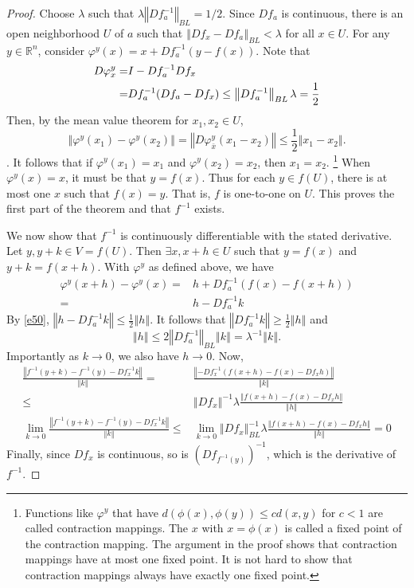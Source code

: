 \documentclass[12pt,reqno]{amsart}
\theoremstyle{definition}
\def\R{\mathbb{R}}
\newcommand{\norm}[1]{\left\Vert {#1} \right\Vert}
\renewcommand{\to}{{\rightarrow}}
\begin{document}
\begin{proof} 
  Choose $\lambda$ such that $\lambda \norm{Df_a^{-1}}_{BL} = 1/2$. Since
  $Df_a$ is continuous, there is an open neighborhood $U$ of $a$ such
  that $\norm{Df_x - Df_a}_{BL} < \lambda$ for all $x \in U$. For any $y
  \in \R^n$, consider $\varphi^y(x) = x + Df_a^{-1} \left(y - f(x)
  \right)$. Note that 
  \begin{align}
    D \varphi^y_x = & I - Df_a^{-1} Df_x \notag \\ 
    = & Df_a^{-1} (Df_a - Df_x) \leq \norm{Df_a^{-1}}_{BL} \lambda =
    \frac{1}{2} \label{e50}
  \end{align}
  Then, by the mean value theorem for $x_1, x_2 \in U$, 
  \[ \norm{\varphi^y(x_1) - \varphi^y(x_2)} = \norm{D\varphi^y_{\bar{x}}
    (x_1 - x_2) } \leq \frac{1}{2} \norm{x_1 - x_2}. \].
  It follows that if $\varphi^y(x_1) = x_1$ and $\varphi^y(x_2) =
  x_2$, then $x_1 = x_2$.
  \footnote{Functions like $\varphi^y$ that have $d(\phi(x),\phi(y))
    \leq c d(x,y)$ for $c<1$ are called contraction mappings. The $x$
    with $x=\phi(x)$ is called a fixed point of the contraction
    mapping. The argument in the proof shows that contraction mappings
    have at most one fixed point. It is not hard to show that
    contraction mappings always have exactly one fixed point.}
  When $\varphi^y(x) = x$, it must be that $y = f(x)$. Thus for each
  $y \in f(U)$, there is at most one $x$ such that $f(x) = y$. That
  is, $f$ is one-to-one on $U$. This proves the first part of the
  theorem and that $f^{-1}$ exists. 

  We now show that $f^{-1}$ is continuously differentiable with the
  stated derivative. Let $y, y+k \in V = f(U)$. Then $\exists x, x+h
  \in U$ such that $y = f(x)$ and $y+k = f(x+h)$. With $\varphi^y$ as
  defined above, we have
  \begin{align*}
    \varphi^y(x+h) - \varphi^y(x) = & h + Df_a^{-1}(f(x) - f(x+h))  \\
    = & h - Df_a^{-1} k
  \end{align*}
  By \ref{e50}, $\norm{h - Df_a^{-1} k} \leq \frac{1}{2} \norm{h}$. It
  follows that $\norm{Df_a^{-1} k} \geq \frac{1}{2} \norm{h}$ and 
  \[ \norm{h} \leq 2 \norm{Df_a^{-1}}_{BL} \norm{k} = \lambda^{-1}
  \norm{k}. \]
  Importantly as $k \to 0$, we also have $h \to 0$. Now, 
  \begin{align*}
    \frac{\norm{f^{-1} (y+k) - f^{-1}(y) - Df_x^{-1} k }}{\norm{k}}
    = & \frac{\norm{-Df_x^{-1}(f(x+h) - f(x) - Df_x h)}}{\norm{k}}
    \\
    \leq & \norm{Df_x}^{-1}\lambda \frac{\norm{f(x+h) - f(x) - Df_x
        h}}{\norm{h}} \\
    \lim_{k \to 0} \frac{\norm{f^{-1} (y+k) - f^{-1}(y) - Df_x^{-1} k
      }}{\norm{k}} \leq & \lim_{k \to 0} \norm{Df_x}_{BL}^{-1}\lambda
    \frac{\norm{f(x+h) - f(x) - Df_x h}}{\norm{h}} = 0
  \end{align*}
  Finally, since $Df_x$ is continuous, so is $(Df_{f^{-1}(y)})^{-1}$,
  which is the derivative of $f^{-1}$.  
\end{proof}
\end{document}
